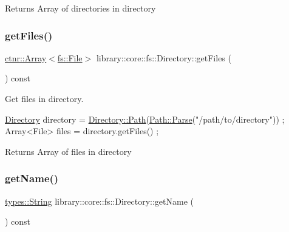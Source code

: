 \begin{DoxyReturn}{Returns}
Array of directories in directory 
\end{DoxyReturn}
\mbox{\label{classlibrary_1_1core_1_1fs_1_1_directory_a9c80c3a09389bb6f024e9a9001dea432}} 
\subsubsection{\texorpdfstring{get\+Files()}{getFiles()}}
{\footnotesize\ttfamily \hyperlink{classlibrary_1_1core_1_1ctnr_1_1_array}{ctnr\+::\+Array}$<$\hyperlink{classlibrary_1_1core_1_1fs_1_1_file}{fs\+::\+File}$>$ library\+::core\+::fs\+::\+Directory\+::get\+Files (\begin{DoxyParamCaption}{ }\end{DoxyParamCaption}) const}



Get files in directory. 


\begin{DoxyCode}
\hyperlink{classlibrary_1_1core_1_1fs_1_1_directory_a3ec39f6cad19a81d520e9a1f2d8bb1f7}{Directory} directory = \hyperlink{classlibrary_1_1core_1_1fs_1_1_directory_a6d3ea04654841e62a4dbd99feb563caf}{Directory::Path}(\hyperlink{classlibrary_1_1core_1_1fs_1_1_path_a6ba644b6609507e724c217bf2020f5ae}{Path::Parse}(\textcolor{stringliteral}{"/path/to/directory"}))
       ;
Array<File> files = directory.getFiles() ;
\end{DoxyCode}


\begin{DoxyReturn}{Returns}
Array of files in directory 
\end{DoxyReturn}
\mbox{\label{classlibrary_1_1core_1_1fs_1_1_directory_acc2dd0ae02ee3733bf20f93ac1d05a56}} 
\subsubsection{\texorpdfstring{get\+Name()}{getName()}}
{\footnotesize\ttfamily \hyperlink{classlibrary_1_1core_1_1types_1_1_string}{types\+::\+String} library\+::core\+::fs\+::\+Directory\+::get\+Name (\begin{DoxyParamCaption}{ }\end{DoxyParamCaption}) const}



